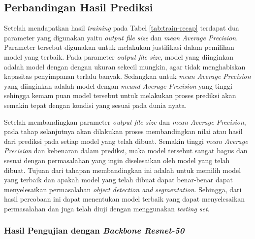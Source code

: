 \subsection{Perbandingan Hasil Prediksi}
\label{subsec:perbandingan-hasil-prediksi}

Setelah mendapatkan hasil \textit{training} pada Tabel \ref{tab:train-recap} terdapat dua parameter yang digunakan yaitu \textit{output file size} dan \textit{mean Average Precision}. Parameter tersebut digunakan untuk melakukan justifikasi dalam pemilihan model yang terbaik. Pada parameter \textit{output file size}, model yang diinginkan adalah model dengan dengan ukuran sekecil mungkin, agar tidak menghabiskan kapasitas penyimpanan terlalu banyak. Sedangkan untuk \textit{mean Average Precision} yang diinginkan adalah model dengan \textit{meand Average Precision} yang tinggi sehingga kemam puan model tersebut untuk melakukan proses prediksi akan semakin tepat dengan kondisi yang sesuai pada dunia nyata.

Setelah membandingkan parameter \textit{output file size} dan \textit{mean Average Precision}, pada tahap selanjutnya akan dilakukan proses membandingkan nilai atau hasil dari prediksi pada setiap model yang telah dibuat. Semakin tinggi \textit{mean Average Precision} dan kebenaran dalam prediksi, maka model tersebut sangat bagus dan sesuai dengan permasalahan yang ingin diselesaikan oleh model yang telah dibuat. Tujuan dari tahapan membandingkan ini adalah untuk memilih model yang terbaik dan apakah model yang telah dibuat dapat benar-benar dapat menyelesaikan permasalahan \textit{object detection and segmentation}. Sehingga, dari hasil percobaan ini dapat menentukan model terbaik yang dapat menyelesaikan permasalahan dan juga telah diuji dengan menggunakan\textit{ testing set}.

\subsubsection{Hasil Pengujian dengan \textit{Backbone Resnet-50}}

